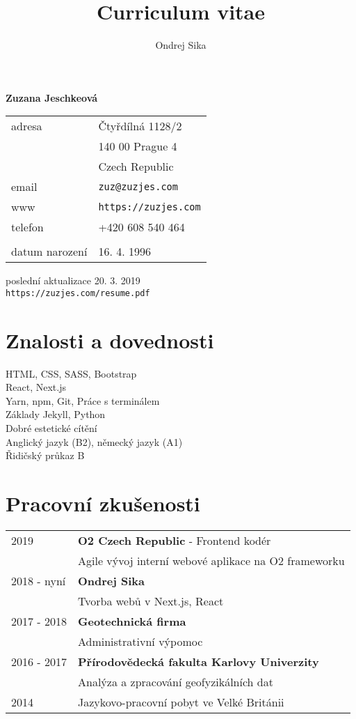\documentclass[12pt,a4paper]{article}
\title{Curriculum vitae}
\author{Ondrej Sika}
\begin{document}
\begin{center}
{\LARGE \bf Zuzana Jeschkeová}\\
\vspace*{0.2cm}
\begin{tabular}{R{5cm}L{5cm}}
adresa & Čtyřdílná 1128/2\\
 & 140 00 Prague 4\\
 & Czech Republic\\
email & \texttt{zuz@zuzjes.com}\\
www & \texttt{https://zuzjes.com}\\
telefon & +420 608 540 464\\
\\
datum narození & 16. 4. 1996\\
\end{tabular}

\vspace*{0.3cm}
{\hfill poslední aktualizace 20. 3. 2019}\\
{\hfill \texttt{https://zuzjes.com/resume.pdf}}
\end{center}

\section*{Znalosti a dovednosti}
HTML, CSS, SASS, Bootstrap\\
React, Next.js\\
Yarn, npm, Git, Práce s terminálem\\
Základy Jekyll, Python\\
Dobré estetické cítění\\
Anglický jazyk (B2), německý jazyk (A1)\\
Řidičský průkaz B\\

\section*{Pracovní zkušenosti}
\begin{tabular}{@{}p{2cm}l}
2019 & {\bf O2 Czech Republic} - Frontend kodér\\
 & Agile vývoj interní webové aplikace na O2 frameworku\\
2018 - nyní & {\bf Ondrej Sika}\\
 & Tvorba webů v Next.js, React\\
2017 - 2018 & {\bf Geotechnická firma}\\
 & Administrativní výpomoc\\
2016 - 2017 & {\bf Přírodovědecká fakulta Karlovy Univerzity}\\
 & Analýza a zpracování geofyzikálních dat\\
2014 & Jazykovo-pracovní pobyt ve Velké Británii\\
\end{tabular}\\
\end{document}
